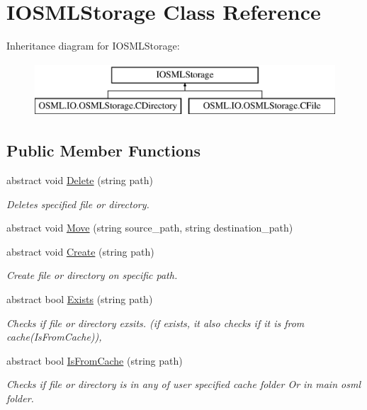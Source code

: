 \hypertarget{classIOSMLStorage}{}\section{I\+O\+S\+M\+L\+Storage Class Reference}
\label{classIOSMLStorage}
Inheritance diagram for I\+O\+S\+M\+L\+Storage\+:\begin{figure}[H]
\begin{center}
\leavevmode
\includegraphics[height=2.000000cm]{classIOSMLStorage}
\end{center}
\end{figure}
\subsection*{Public Member Functions}
\begin{DoxyCompactItemize}
\item 
abstract void \mbox{\hyperlink{classIOSMLStorage_aca08055c799d8c86bfdc427c54b92993}{Delete}} (string path)
\begin{DoxyCompactList}\small\item\em Deletes specified file or directory. \end{DoxyCompactList}\item 
abstract void \mbox{\hyperlink{classIOSMLStorage_a8646a392bda2184f21ae3439d67240a5}{Move}} (string source\+\_\+path, string destination\+\_\+path)
\item 
abstract void \mbox{\hyperlink{classIOSMLStorage_a95cdf051ac2045a9cfa4fb29a78b26c0}{Create}} (string path)
\begin{DoxyCompactList}\small\item\em Create file or directory on specific path. \end{DoxyCompactList}\item 
abstract bool \mbox{\hyperlink{classIOSMLStorage_adc2fa33637c24f1a5c7f3e9dc746c5c6}{Exists}} (string path)
\begin{DoxyCompactList}\small\item\em Checks if file or directory exsits. (if exists, it also checks if it is from cache(\+Is\+From\+Cache)), \end{DoxyCompactList}\item 
abstract bool \mbox{\hyperlink{classIOSMLStorage_af3e0ef9f76c9739c3e685b1295cdf90a}{Is\+From\+Cache}} (string path)
\begin{DoxyCompactList}\small\item\em Checks if file or directory is in any of user specified cache folder Or in main osml folder. \end{DoxyCompactList}\end{DoxyCompactItemize}


